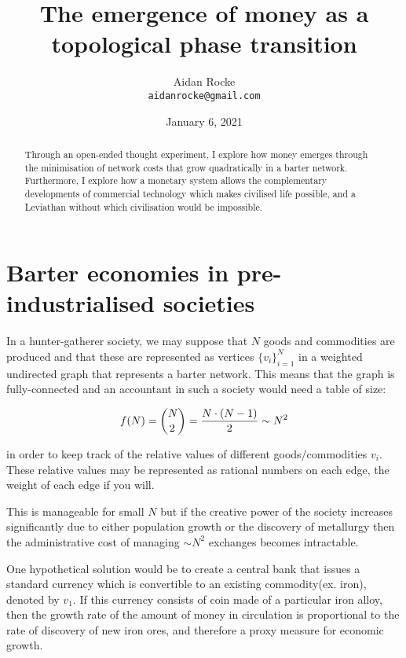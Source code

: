 \documentclass{article}
\title{The emergence of money as a topological phase transition}
\date{January 6, 2021}
\author{%
  Aidan Rocke\\
  \texttt{aidanrocke@gmail.com} \\
}
\begin{document}

\maketitle

\begin{abstract}
   Through an open-ended thought experiment, I explore how money 
   emerges through the minimisation of network costs that grow quadratically in a barter network. Furthermore, I explore how a monetary system allows the complementary developments of commercial technology which makes civilised life possible, and a Leviathan without which civilisation would be impossible. 
\end{abstract}

\section{Barter economies in pre-industrialised societies}

In a hunter-gatherer society, we may suppose that $N$ goods and commodities are produced
and that these are represented as vertices $\{v_i\}_{i=1}^N$ in a weighted undirected graph
that represents a barter network. This means that the graph is fully-connected and an
accountant in such a society would need a table of size:

\begin{equation}
f(N) = \\{N \choose 2 \\} = \frac{N \cdot (N-1)}{2} \sim N^2
\end{equation}

in order to keep track of the relative values of different goods/commodities $v_i$. These
relative values may be represented as rational numbers on each edge, the weight of each
edge if you will.

This is manageable for small $N$ but if the creative power of the society increases significantly due to either population growth or the discovery of metallurgy then the administrative cost of managing $\sim N^2$ exchanges becomes intractable.

One hypothetical solution would be to create a central bank that issues a standard currency
which is convertible to an existing commodity(ex. iron), denoted by $v_1$. If
this currency consists of coin made of a particular iron alloy, then the growth rate of the
amount of money in circulation is proportional to the rate of discovery of new iron ores, and
therefore a proxy measure for economic growth.
\end{document}

